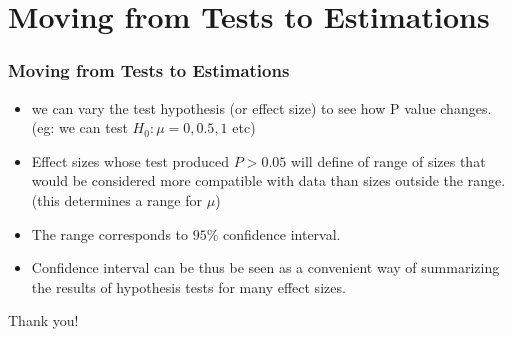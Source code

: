 \documentclass{beamer}
\begin{document}
\section{Moving from Tests to Estimations}

\begin{frame}
\frametitle{Moving from Tests to Estimations}
\begin{itemize}
\item we can vary the test hypothesis (or effect size) to see how P value changes. (eg: we can test $H_{0}: \mu = 0,0.5, 1$ etc) \pause
\item Effect sizes whose test produced $P > 0.05$ will define of range of sizes that would be considered more compatible with data than sizes outside the range. (this determines a range for $\mu$) 
\item The range corresponds to $95\%$ confidence interval. \pause
\item Confidence interval can be thus be seen as a convenient way of summarizing the results of hypothesis tests for many effect sizes. 
\end{itemize}
\end{frame}


\begin{frame}
\begin{center}
\Huge Thank you!
\end{center}

\end{frame}









 
\end{document}
